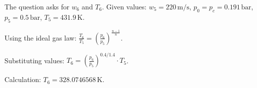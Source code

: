 The question asks for \( w_6 \) and \( T_6 \).  
Given values:  
\( w_5 = 220 \, \text{m/s} \), \( p_0 = p_c = 0.191 \, \text{bar} \), \( p_5 = 0.5 \, \text{bar} \), \( T_5 = 431.9 \, \text{K} \).  

Using the ideal gas law:  
\( \frac{T_6}{T_5} = \left( \frac{p_6}{p_5} \right)^{\frac{n-1}{n}} \).  

Substituting values:  
\( T_6 = \left( \frac{p_6}{p_5} \right)^{0.4/1.4} \cdot T_5 \).  

Calculation:  
\( T_6 = 328.0746568 \, \text{K} \).